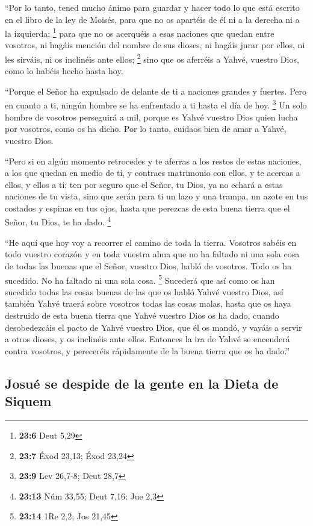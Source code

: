  ``Por lo tanto, tened mucho ánimo para guardar y hacer
todo lo que está escrito en el libro de la ley de Moisés, para que no os
apartéis de él ni a la derecha ni a la izquierda; \footnote{\textbf{23:6}
  Deut 5,29}  para que no os acerquéis a esas naciones que
quedan entre vosotros, ni hagáis mención del nombre de sus dioses, ni
hagáis jurar por ellos, ni les sirváis, ni os inclinéis ante ellos;
\footnote{\textbf{23:7} Éxod 23,13; Éxod 23,24}  sino que
os aferréis a Yahvé, vuestro Dios, como lo habéis hecho hasta hoy.

 ``Porque el Señor ha expulsado de delante de ti a
naciones grandes y fuertes. Pero en cuanto a ti, ningún hombre se ha
enfrentado a ti hasta el día de hoy. \footnote{\textbf{23:9} Lev 26,7-8;
  Deut 28,7}  Un solo hombre de vosotros perseguirá a
mil, porque es Yahvé vuestro Dios quien lucha por vosotros, como os ha
dicho.  Por lo tanto, cuidaos bien de amar a Yahvé,
vuestro Dios.

 ``Pero si en algún momento retrocedes y te aferras a los
restos de estas naciones, a los que quedan en medio de ti, y contraes
matrimonio con ellos, y te acercas a ellos, y ellos a ti;
 ten por seguro que el Señor, tu Dios, ya no echará a
estas naciones de tu vista, sino que serán para ti un lazo y una trampa,
un azote en tus costados y espinas en tus ojos, hasta que perezcas de
esta buena tierra que el Señor, tu Dios, te ha dado. \footnote{\textbf{23:13}
  Núm 33,55; Deut 7,16; Jue 2,3}

 ``He aquí que hoy voy a recorrer el camino de toda la
tierra. Vosotros sabéis en todo vuestro corazón y en toda vuestra alma
que no ha faltado ni una sola cosa de todas las buenas que el Señor,
vuestro Dios, habló de vosotros. Todo os ha sucedido. No ha faltado ni
una sola cosa. \footnote{\textbf{23:14} 1Re 2,2; Jos 21,45}
 Sucederá que así como os han sucedido todas las cosas
buenas de las que os habló Yahvé vuestro Dios, así también Yahvé traerá
sobre vosotros todas las cosas malas, hasta que os haya destruido de
esta buena tierra que Yahvé vuestro Dios os ha dado, 
cuando desobedezcáis el pacto de Yahvé vuestro Dios, que él os mandó, y
vayáis a servir a otros dioses, y os inclinéis ante ellos. Entonces la
ira de Yahvé se encenderá contra vosotros, y pereceréis rápidamente de
la buena tierra que os ha dado.''

\hypertarget{josuuxe9-se-despide-de-la-gente-en-la-dieta-de-siquem}{%
\subsection{Josué se despide de la gente en la Dieta de
Siquem}\label{josuuxe9-se-despide-de-la-gente-en-la-dieta-de-siquem}}

